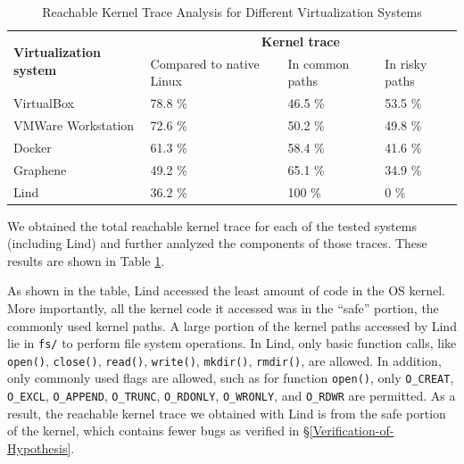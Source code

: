 {\begin{table}
\centering
\scriptsize
\caption{Reachable Kernel Trace Analysis for Different Virtualization
Systems}
\begin{tabular}{|l|l|l|l|}
  \hline
  \multirow{3}{1.5cm}{\bf Virtualization system} & \multicolumn{3}{c|}{\bf Kernel trace} \\ \cline{2-4}
  & \multirow{2}{1.5cm}{Compared to native Linux} & \multirow{2}{1.5cm}{In common paths} & \multirow{2}{1cm}{In risky paths} \\
  & & & \\  \hline
  VirtualBox & 78.8 \% & 46.5 \% & 53.5 \% \\
  \hline
  \multirow{2}{1.5cm}{VMWare Workstation} & \multirow{2}{*}{72.6 \%} &
  \multirow{2}{*}{50.2 \%} & \multirow{2}{*}{49.8 \%} \\
  & & & \\   \hline
  Docker & 61.3 \% & 58.4 \% & 41.6 \% \\
  \hline
  Graphene & 49.2 \% & 65.1 \% & 34.9 \% \\
  \hline
  Lind & 36.2 \% & 100 \% & 0 \% \\
  \hline
\end{tabular}
\label{table:trace-systems}
\end{table}

We obtained the total reachable kernel trace for
each of the tested systems (including Lind)
and further analyzed the components of those traces. These results
are shown in Table \ref{table:trace-systems}.

As shown in the table, Lind accessed the least amount of code in the OS
kernel. More importantly,
all the kernel code it accessed was in the ``safe'' portion, the
commonly used kernel paths.
A large portion of the kernel paths accessed by Lind lie in
\texttt{fs/} to perform file system operations.
In Lind, only basic function calls,
like \texttt{open()}, \texttt{close()}, \texttt{read()}, \texttt{write()}, \texttt{mkdir()},
\texttt{rmdir()}, are allowed. In addition, only commonly used flags are allowed, such as
for function \texttt{open()}, only
\texttt{O\_CREAT}, \texttt{O\_EXCL}, \texttt{O\_APPEND}, \texttt{O\_TRUNC},
\texttt{O\_RDONLY}, \texttt{O\_WRONLY}, and \texttt{O\_RDWR} are permitted.
As a result, the reachable kernel trace we obtained with Lind is from the safe
portion of the kernel, which contains fewer bugs
as verified in \S{\ref{Verification-of-Hypothesis}}.

}
